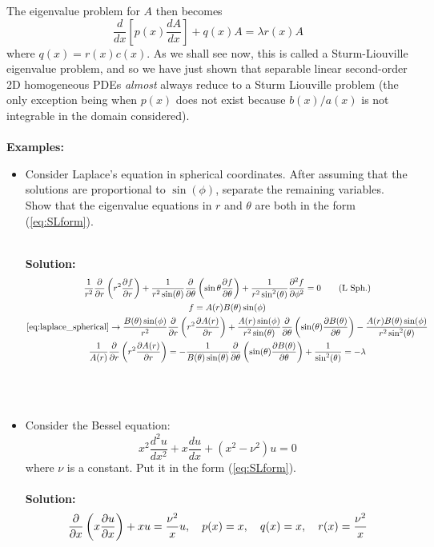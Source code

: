 The eigenvalue problem for $A$ then becomes
\begin{equation}
     \frac{d}{dx} \left[ p(x) \frac{dA}{dx}\right] + q(x) A  = \lambda r(x)  A  
     \label{eq:SLform}
\end{equation}
where $q(x) = r(x) c(x)$. As we shall see now, this is called a Sturm-Liouville eigenvalue problem, and so we have just shown that separable linear second-order 2D homogeneous PDEs  {\it almost} always reduce to a Sturm Liouville problem (the only exception being when $p(x)$ does not exist because $b(x)/a(x)$ is not integrable in the domain considered). 
\\
\\
{\bf Examples:}
\begin{itemize}
    \item Consider Laplace's equation in spherical coordinates. After assuming that the solutions are proportional to $\sin(\phi)$, separate the remaining variables. Show that the  eigenvalue equations in $r$ and $\theta$ are both in the form (\ref{eq:SLform}).
      \\
    \\
    {\color{red} \bf Solution:
    \begin{gather*}
        \frac{1}{r^2}\frac{\partial }{\partial r}\left(r^2\frac{\partial f}{\partial r}\right) +
        \frac{1}{r^2\sin(\theta)}\frac{\partial }{\partial \theta}\left(\sin{\theta}\frac{\partial f}{\partial \theta}\right)
        + \frac{1}{r^2\sin^2(\theta)}\frac{\partial^2 f}{\partial \phi^2} = 0
        \label{eq:laplace_spherical} \tag{L Sph.}\\
        f = A(r)B(\theta)\sin(\phi)\\
        \eqref{eq:laplace_spherical} \to
        \frac{B(\theta)\sin(\phi)}{r^2}\frac{\partial }{\partial r}\left(r^2\frac{\partial A(r)}{\partial r}\right) +
        \frac{A(r)\sin(\phi)}{r^2\sin(\theta)}\frac{\partial }{\partial \theta}\left(\sin(\theta)\frac{\partial B(\theta)}{\partial \theta}\right)
        - \frac{A(r)B(\theta)\sin(\phi)}{r^2\sin^2(\theta)}\\
        \frac{1}{A(r)}\frac{\partial }{\partial r}\left(r^2\frac{\partial A(r)}{\partial r}\right) = -
        \frac{1}{B(\theta)\sin(\theta)}\frac{\partial }{\partial \theta}\left(\sin(\theta)\frac{\partial B(\theta)}{\partial \theta}\right)
        + \frac{1}{\sin^2(\theta)} = -\lambda
    \end{gather*}

    }
    \\
    \\
    \item Consider the Bessel equation:
\begin{equation}
x^2 \frac{d^2 u}{dx^2}  + x \frac{d u}{dx}   + (x^2 - \nu^2) u  = 0 
\end{equation}
where $\nu$ is a constant. Put it in the form (\ref{eq:SLform}).
 \\
    \\
    {\color{red} \bf Solution:
    \begin{gather*}
        \frac{\partial }{\partial x}\left(x\frac{\partial u}{\partial x}\right) + xu = \frac{\nu^2}{x}u, \quad p(x) = x,
        \quad q(x) = x, \quad r(x) = \frac{\nu^2}{x}
    \end{gather*}
    }
    \\
    \\
\end{itemize}

